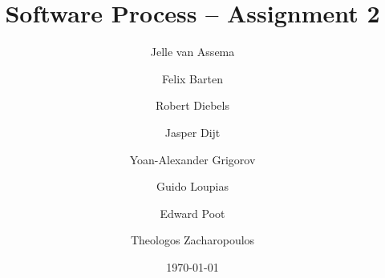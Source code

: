 \documentclass[titlepage, 11pt]{report}
\title{Software Process -- Assignment 2}
\author{Jelle van Assema 
  \and Felix Barten
  \and Robert Diebels
  \and Jasper Dijt
  \and Yoan-Alexander Grigorov
  \and Guido Loupias
  \and Edward Poot 
  \and Theologos Zacharopoulos
}
\date{\today}
\begin{document}
\maketitle

\tableofcontents{}















\begin{appendices}
    
\end{appendices}
\end{document}
